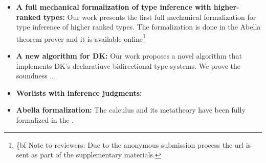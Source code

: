 \begin{itemize}

\item {\bf A full mechanical formalization of type inference with
  higher-ranked types:} Our work presents the first full mechanical formalization
  for type inference of higher ranked types. The formalization is done in the
  Abella theorem prover\cite{AbellaDesc} and it is available
  online\footnote{{\{bf Note to reviewers:} Due to the anonymous submission process
  the url is sent as part of the supplementary materials.}

\item {\bf A new algorithm for DK:} Our work proposes a novel algorithm that implements
  DK's declaratiuve bidirectional type systems. We prove the soundness ...

\item {\bf Worlists with inference judgments:}

\item {\bf Abella formalization:} The calculus and its metatheory
have been fully formalized in the .


\end{itemize}
